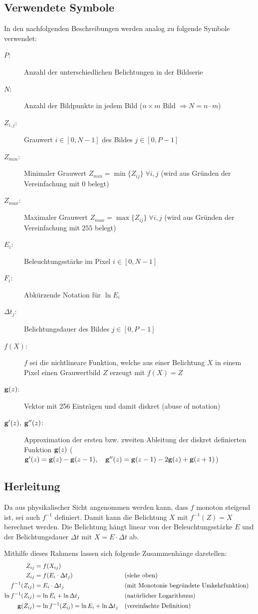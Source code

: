 \subsection{Verwendete Symbole}
In den nachfolgenden Beschreibungen werden analog zu \cite{paper} folgende Symbole verwendet:
\begin{description}
\item[$P$:] Anzahl der unterschiedlichen Belichtungen in der Bildserie
\item[$N$:] Anzahl der Bildpunkte in jedem Bild ($n \times m$ Bild $\Rightarrow N = n \cdot m$)
\item[$Z_{i,j}$:] Grauwert $i \in [0, N-1]$ des Bildes $j \in [0, P-1]$
\item[$Z_{min}$:] Minimaler Grauwert $Z_{min} = \min \{Z_{ij}\} \; \forall i,j$ (wird aus Gründen der Vereinfachung mit $0$ belegt)
\item[$Z_{max}$:] Maximaler Grauwert $Z_{max} = \max \{Z_{ij}\} \; \forall i,j$ (wird aus Gründen der Vereinfachung mit $255$ belegt)
\item[$E_i$:] Beleuchtungsstärke im Pixel $i \in [0, N-1]$ 
\item[$F_i$:] Abkürzende Notation für $\ln E_i$
\item[$\Delta t_j$:] Belichtungsdauer des Bildes $j \in [0, P-1]$
\item[$f(X)$:] $f$ sei die nichtlineare Funktion, welche aus einer Belichtung $X$ in einem Pixel einen Grauwertbild $Z$ erzeugt mit $f(X) = Z$
\item[$\mathbf g(z)$:] Vektor mit 256 Einträgen und damit diskret (abuse of notation)
\item[$\mathbf{g}'(z), \; \mathbf{g}''(z) $:] Approximation der ersten bzw. zweiten Ableitung der diskret definierten Funktion $\mathbf g(z)$ ($\mathbf g'(z) = \mathbf g(z) - \mathbf g(z-1),\quad \mathbf g''(z) = \mathbf g(z-1)-2\mathbf g(z)+\mathbf g(z+1)$)\\
\end{description}

\subsection{Herleitung}
Da aus physikalischer Sicht angenommen werden kann, dass $f$ monoton steigend ist, sei auch $f^{-1}$ definiert. Damit kann die Belichtung $X$ mit $f^{-1}(Z) = X$ berechnet werden. Die Belichtung hängt linear von der Beleuchtungsstärke $E$ und der Belichtungsdauer $\Delta t$ mit $X = E \cdot \Delta t$ ab.

Mithilfe dieses Rahmens lassen sich folgende Zusammenhänge darstellen:
\begin{align*}
Z_{ij} &= f(X_{ij})\\
Z_{ij} &=f(E_i \cdot \Delta t_j)&&\text{(siehe oben)}\\
f^{-1}(Z_{ij}) &= E_i \cdot \Delta t_j & &\text{(mit Monotonie begründete Umkehrfunktion)}\\
\ln f^{-1}(Z_{ij}) &= \ln E_i + \ln \Delta t_j&&\text{(natürlicher Logarithmus)}\\
\mathbf g(Z_{ij}) &= \ln f^{-1}(Z_{ij}) = \ln E_i + \ln \Delta t_j && \text{(vereinfachte Definition)}\\
\end{align*}

